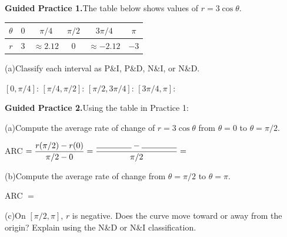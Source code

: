 \documentclass[10pt]{article}
\begin{document}
\vspace{0.08in}

\begin{practicebox}

\textbf{Guided Practice 1.}\quad The table below shows values of $r = 3\cos\theta$.

\vspace{4pt}
\renewcommand{\arraystretch}{1.5}
\begin{tabular}{|c|c|c|c|c|c|}
\hline
$\theta$ & $0$ & $\pi/4$ & $\pi/2$ & $3\pi/4$ & $\pi$ \\
\hline
$r$ & $3$ & $\approx 2.12$ & $0$ & $\approx -2.12$ & $-3$ \\
\hline
\end{tabular}

\vspace{6pt}
(a)\quad Classify each interval as P\&I, P\&D, N\&I, or N\&D.

\vspace{4pt}
$[0, \pi/4]$: \underline{\hspace{2.5cm}} \quad
$[\pi/4, \pi/2]$: \underline{\hspace{2.5cm}} \quad
$[\pi/2, 3\pi/4]$: \underline{\hspace{2.5cm}} \quad
$[3\pi/4, \pi]$: \underline{\hspace{2.5cm}}

\vspace{0.10in}
\textbf{Guided Practice 2.}\quad Using the table in Practice 1:

\vspace{4pt}
(a)\quad Compute the average rate of change of $r = 3\cos\theta$ from $\theta = 0$ to $\theta = \pi/2$.

\vspace{4pt}
ARC $= \dfrac{r(\pi/2) - r(0)}{\pi/2 - 0} = \dfrac{\rule{1.5cm}{0.4pt} - \rule{1.5cm}{0.4pt}}{\pi/2} = $ \blank{3cm}

\vspace{6pt}
(b)\quad Compute the average rate of change from $\theta = \pi/2$ to $\theta = \pi$.

\vspace{4pt}
ARC $= $ \blank{5cm}

\vspace{6pt}
(c)\quad On $[\pi/2, \pi]$, $r$ is negative. Does the curve move toward or away from the origin?
Explain using the N\&D or N\&I classification.

\writeline

\end{practicebox}
\end{document}
